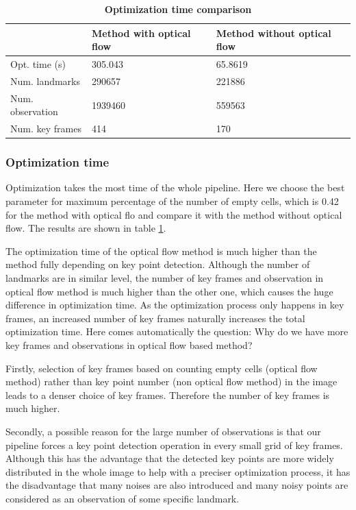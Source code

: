 \documentclass{easychair}
\begin{document}
\begin{table}[b]
	\centering
	\caption{\textbf{Optimization time comparison}}
	\label{tab:optimization}
	\begin{tabular}{lll}
		& Method with optical flow & Method without optical flow   \\ \hline
		Opt. time (s)  & 305.043 & 65.8619\\
		Num. landmarks &290657 &221886\\
		Num. observation & 1939460 & 559563 \\        
		Num. key frames & 414 & 170                 
	\end{tabular}
\end{table}

\subsubsection{Optimization time}
Optimization takes the most time of the whole pipeline. Here we choose the best parameter for maximum percentage of the number of empty cells, which is 0.42 for the method with optical flo and compare it with the method without optical flow. The results are shown in table \ref{tab:optimization}.

The optimization time of the optical flow method is much higher than the method fully depending on key point detection. Although the number of landmarks are in similar level, the number of key frames and observation in optical flow method is much higher than the other one, which causes the huge difference in optimization time. As the optimization process only happens in key frames, an increased number of key frames naturally increases the total optimization time. Here comes automatically the question: Why do we have more key frames and observations in optical flow based method?

Firstly, selection of key frames based on counting empty cells (optical flow method) rather than key point number (non optical flow method) in the image leads to a denser choice of key frames. Therefore the number of key frames is much higher.

Secondly, a possible reason for the large number of observations is that our pipeline forces a key point detection operation in every small grid of key frames. Although this has the advantage that the detected key points are more widely distributed in the whole image to help with a preciser optimization process, it has the disadvantage that many noises are also introduced and many noisy points are considered as an observation of some specific landmark.  
\end{document}
